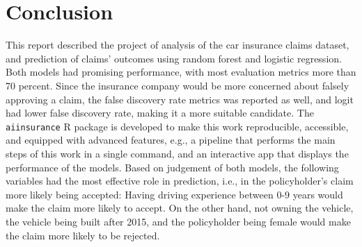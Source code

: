 \documentclass{article}
\begin{document}
\hypertarget{conclusion}{%
\section{Conclusion}\label{conclusion}}

This report described the project of analysis of the car insurance
claims dataset, and prediction of claims' outcomes using random forest
and logistic regression. Both models had promising performance, with
most evaluation metrics more than 70 percent. Since the insurance
company would be more concerned about falsely approving a claim, the
false discovery rate metrics was reported as well, and logit had lower
false discovery rate, making it a more suitable candidate. The
\texttt{aiinsurance} R package \cite{package} is developed to make this
work reproducible, accessible, and equipped with advanced features,
e.g., a pipeline that performs the main steps of this work in a single
command, and an interactive app that displays the performance of the
models. Based on judgement of both models, the following variables had
the most effective role in prediction, i.e., in the policyholder's claim
more likely being accepted: Having driving experience between 0-9 years
would make the claim more likely to accept. On the other hand, not
owning the vehicle, the vehicle being built after 2015, and the
policyholder being female would make the claim more likely to be
rejected.



\end{document}
